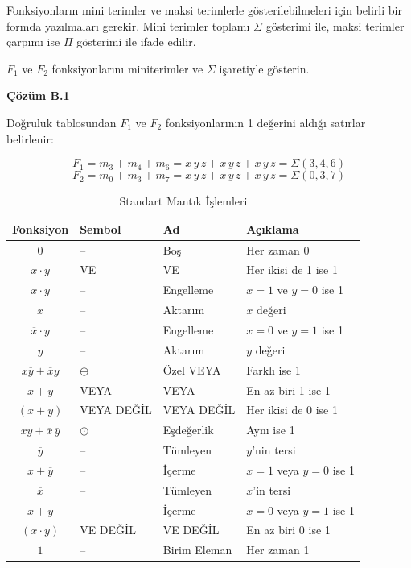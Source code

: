 Fonksiyonların mini terimler ve maksi terimlerle gösterilebilmeleri için belirli bir formda yazılmaları gerekir. Mini terimler toplamı $\Sigma$ gösterimi ile, maksi terimler çarpımı ise $\Pi$ gösterimi ile ifade edilir.

\begin{ornek}[B.1]
$F_1$ ve $F_2$ fonksiyonlarını miniterimler ve $\Sigma$ işaretiyle gösterin.

\textbf{Çözüm B.1}

Doğruluk tablosundan $F_1$ ve $F_2$ fonksiyonlarının 1 değerini aldığı satırlar belirlenir:

\[
    F_1 = m_3 + m_4 + m_6 = \overline{x}\,y\,z + x\,\overline{y}\,\overline{z} + x\,y\,\overline{z} = \Sigma(3,4,6)
\]
\[
    F_2 = m_0 + m_3 + m_7 = \overline{x}\,\overline{y}\,\overline{z} + \overline{x}\,y\,z + x\,y\,z = \Sigma(0,3,7)
\]
\end{ornek}

\begin{table}[H]
\centering
\caption{Standart Mantık İşlemleri}
\label{tab:B.5}
\begin{tabular}{clll}
\toprule
\textbf{Fonksiyon} & \textbf{Sembol} & \textbf{Ad} & \textbf{Açıklama} \\
\midrule
$0$ & -- & Boş & Her zaman 0 \\
$x \cdot y$ & VE & VE & Her ikisi de 1 ise 1 \\
$x \cdot \overline{y}$ & -- & Engelleme & $x=1$ ve $y=0$ ise 1 \\
$x$ & -- & Aktarım & $x$ değeri \\
$\overline{x} \cdot y$ & -- & Engelleme & $x=0$ ve $y=1$ ise 1 \\
$y$ & -- & Aktarım & $y$ değeri \\
$x\overline{y} + \overline{x}y$ & $\oplus$ & Özel VEYA & Farklı ise 1 \\
$x + y$ & VEYA & VEYA & En az biri 1 ise 1 \\
$\overline{(x + y)}$ & VEYA DEĞİL & VEYA DEĞİL & Her ikisi de 0 ise 1 \\
$x y + \overline{x}\,\overline{y}$ & $\odot$ & Eşdeğerlik & Aynı ise 1 \\
$\overline{y}$ & -- & Tümleyen & $y$'nin tersi \\
$x + \overline{y}$ & -- & İçerme & $x=1$ veya $y=0$ ise 1 \\
$\overline{x}$ & -- & Tümleyen & $x$'in tersi \\
$\overline{x} + y$ & -- & İçerme & $x=0$ veya $y=1$ ise 1 \\
$\overline{(x \cdot y)}$ & VE DEĞİL & VE DEĞİL & En az biri 0 ise 1 \\
$1$ & -- & Birim Eleman & Her zaman 1 \\
\bottomrule
\end{tabular}
\end{table}

